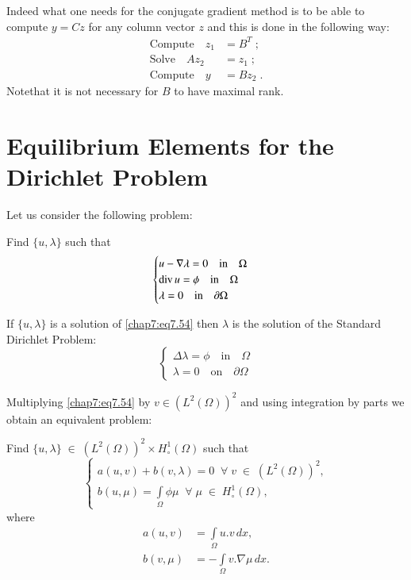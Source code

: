 \begin{itemize}
\hspace{1cm} Indeed what one needs for the conjugate gradient method is to 
be able to compute $y=Cz$ for any column vector $z$ and this is done in the
following way:
\begin{align*}
\text{Compute}\quad z_1 &= B^T\; ;\\
\text{Solve}\quad Az_2 &= z_1\; ;\\
\text{Compute}\quad y &= Bz_2\; .
\end{align*}
Note\pageoriginale that it is not necessary for $B$ to have maximal rank.
\end{itemize}

\section{Equilibrium Elements for the Dirichlet  Problem}\label{chap7:ssec7.10}
 Let us consider the following
problem: 

Find $\{u,\lambda\}$ such that 
\begin{equation}\label{chap7:eq7.54}
\begin{cases}
u-\nabla\lambda = 0\quad\text{in}\quad\Omega\\
\operatorname{div} u = \phi\quad\text{in}\quad\Omega\\
\lambda = 0 \quad\text{in}\quad\partial\Omega
\end{cases}
\end{equation}

If $\{u,\lambda\}$ is a solution of \eqref{chap7:eq7.54} then
$\lambda$ is the solution of the Standard Dirichlet Problem:
\begin{equation}\label{chap7:eq7.55}
\begin{cases}
\Delta\lambda = \phi\quad\text{in}\quad\Omega\\
\lambda = 0 \quad\text{on}\quad\partial\Omega
\end{cases}
\end{equation}

Multiplying \eqref{chap7:eq7.54} by $v\in (L^2(\Omega))^2$ and
using integration by parts we obtain an equivalent problem:

Find $\{u,\lambda\}\;\in \;(L^2(\Omega))^2\times
H_\circ^1(\Omega)$ such that 
\begin{equation*}
\begin{cases}
a(u,v)+b(v,\lambda)=0\; \; \forall \;v\;\in \;(L^2(\Omega))^2,\\
b(u,\mu) = \int\limits_\Omega\phi\mu\; \; \forall \;\mu \;\in
\;H_\circ^1(\Omega), 
\end{cases}
\end{equation*}
where
\begin{align*}
a(u,v) &= \int\limits_\Omega u.v\,dx,\\
b(v,\mu) &= -\int\limits_\Omega v.\nabla\mu \,dx.
\end{align*}

